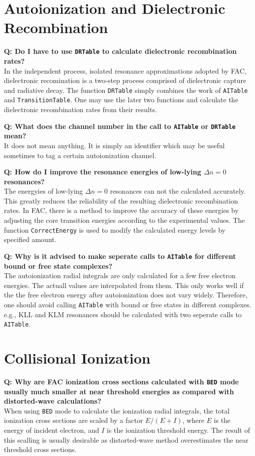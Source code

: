 \documentclass[twoside,letterpaper]{refrep}
\newcommand{\key}[1]{\texttt{#1}}
\newcounter{faq}[section]
\newcommand{\faq}[2]{\stepcounter{faq}
	\begin{minipage}{\textwidth}
	\textbf{Q\arabic{faq}: #1?}\\#2
	\end{minipage}}
\begin{document}
\section{Autoionization and Dielectronic Recombination}{
\faq{Do I have to use \key{DRTable} to calculate dielectronic recombination
rates}{
In the independent process, isolated resonance approximations adopted by FAC,
dielectronic recomination is a two-step process comprised of dielectronic
capture and radiative decay. The function \key{DRTable} simply combines the
work of \key{AITable} and \key{TransitionTable}. One may use the later two
functions and calculate the dielectronic recombination rates from their
results.}

\faq{What does the channel number in the call to \key{AITable} or
\key{DRTable} mean}{
It does not mean anything. It is simply an identifier which may be useful
sometimes to tag a certain autoionization channel.}

\faq{How do I improve the resonance energies of low-lying $\Delta n = 0$
resonances}{
The energyies of low-lying $\Delta n = 0$ resonances can not the calculated
accurately. This greatly reduces the reliability of the resulting dielectronic
recombination rates. In FAC, there is a method to improve the accuracy of
these energies by adjusting the core transition energies according to the
experimental values. The function \key{CorrectEnergy} is used to modify the
calculated energy levels by specified amount.}

\faq{Why is it advised to make seperate calls to \key{AITable} for different
bound or free state complexes}{
The autoionization radial integrals are only calculated for a few free
electron energies. The actuall values are interpolated from them. This only
works well if the the free electron energy after autoionization does not vary
widely. Therefore, one should avoid calling \key{AITable} with bound or free
states in different complexes. e.g., KLL and KLM resonances should be
calculated with two seperate calls to \key{AITable}.}

\section{Collisional Ionization}
\faq{Why are FAC ionization cross sections calculated with \key{BED} mode
usually much smaller at near threshold energies as compared with
distorted-wave calculations}{
When using \key{BED} mode to calculate the ionization radial integrals, the
total ionization cross sections are scaled by a factor $E/(E+I)$, where $E$ is
the energy of incident electron, and $I$ is the ionization threshold
energy. The result of this scalling is usually desirable as distorted-wave
method overestimates the near threshold cross sections.}

}
\end{document}
